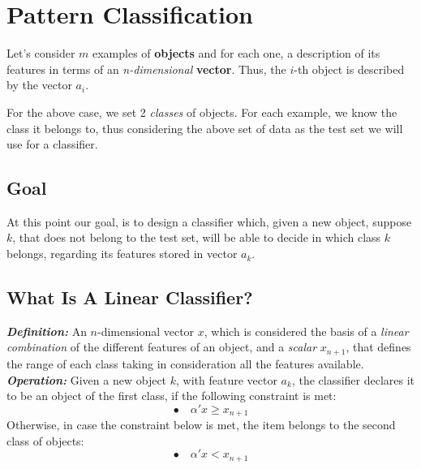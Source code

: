 \documentclass[12pt]{article}
\begin{document}
\section{Pattern Classification}
{Let's consider \textbf{$m$} examples of \textbf{objects} and for each one, a description of its features in terms of an \textit{n-dimensional} \textbf{vector}. Thus, the $i$-th object is described by the vector $a_i$.\par
For the above case, we set 2 \textit{classes} of objects. For each example, we know the class it belongs to, thus considering the above set of data as the test set we will use for a classifier.\par
\subsection*{Goal}
At this point our goal, is to design a classifier which, given a new object, suppose \textbf{$k$}, that does not belong to the test set, will be able to decide in which class \textbf{$k$} belongs, regarding its features stored in vector $a_k$.\par
\subsection*{What Is A Linear Classifier?}
\textbf{\textit{Definition:}} An $n$-dimensional vector $x$, which is considered the basis of a \textit{linear combination} of the different features of an object, and a \textit{scalar} $x_{n+1}$, that defines the range of each class taking in consideration all the features available.\\
\textbf{\textit{Operation:}} Given a new object $k$, with feature vector $a_k$, the classifier declares it to be an object of the first class, if the following constraint is met:
$$\bullet \quad \alpha'x \geq x_{n+1}$$
Otherwise, in case the constraint below is met, the item belongs to the second class of objects:
$$\bullet \quad \alpha'x < x_{n+1}$$
\newpage
}
\end{document}
